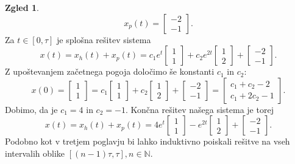 \documentclass[12pt,a4paper]{amsart}
\theoremstyle{definition} %
\newtheorem{zgled}[definicija]{Zgled}
\theoremstyle{plain} %
\newcommand{\N}{\mathbb N}
\begin{document}
\begin{zgled}
    \[x_p(t)=
    \begin{bmatrix}
        -2  \\
        -1  
    \end{bmatrix}.\]
    Za $t\in[0,\tau]$ je splošna rešitev sistema
    \[x(t)=x_h(t)+x_p(t)= c_1e^t\begin{bmatrix}
        1 \\
        1 
    \end{bmatrix}
    +c_2e^{2t}\begin{bmatrix}
        1 \\
        2 
    \end{bmatrix} + \begin{bmatrix}
        -2  \\
        -1  
    \end{bmatrix}.\]
    Z upoštevanjem začetnega pogoja določimo še konstanti $c_1$ in $c_2$:
    \[x(0)=\begin{bmatrix}
        1  \\
        1  
    \end{bmatrix} = c_1 \begin{bmatrix}
        1  \\
        1  
    \end{bmatrix} + c_2 \begin{bmatrix}
        1  \\
        2  
    \end{bmatrix} + \begin{bmatrix}
        -2  \\
        -1  
    \end{bmatrix} = \begin{bmatrix}
        c_1 + c_2 -2  \\
        c_1+2c_2 -1  
    \end{bmatrix}.\]
    Dobimo, da je $c_1=4$ in $c_2=-1$. Končna rešitev našega sistema je torej 
    \[x(t)=x_h(t)+x_p(t)= 4e^t\begin{bmatrix}
        1 \\
        1 
    \end{bmatrix}
    -e^{2t}\begin{bmatrix}
        1 \\
        2 
    \end{bmatrix} + \begin{bmatrix}
        -2  \\
        -1  
    \end{bmatrix}.\]
    Podobno kot v tretjem poglavju bi lahko induktivno poiskali rešitve na vseh intervalih oblike
    $[(n-1)\tau,\tau], n\in\N$.


\end{zgled}
\end{document}
